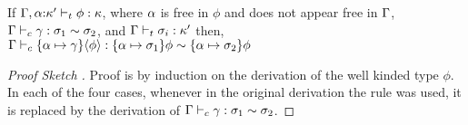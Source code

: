 \documentclass[screen,nonacm,manuscript,review]{acmart} %
\begin{document}
\begin{theorem}\label{lem:sfc-coercion-lifting}
 If $\Gamma,\alpha{:}\kappa' \vdash_{t} \phi : \kappa$, where $\alpha$ is free in $\phi$
 and does not appear free in $\Gamma$,
 $\Gamma \vdash_{c} \gamma : \sigma_1\sim\sigma_2$, and $\Gamma \vdash_{t} \sigma_i : \kappa'$
 then, $\Gamma \vdash_{c} \{\alpha\mapsto \gamma\}\langle{\phi}\rangle : \{\alpha\mapsto\sigma_1\}\phi\sim\{\alpha\mapsto\sigma_2\}\phi$
\end{theorem}
\begin{proof}[Proof Sketch ]
 Proof is by induction on the derivation of the well kinded type
 $\phi$. In each of the four cases, whenever in the original
 derivation the rule  was used, it is replaced by the
 derivation of $\Gamma \vdash_{c} \gamma : \sigma_1\sim\sigma_2$.
\end{proof}

\newcommand\TVar{
 \ib{\irule[\trule{var}]
 {x\co\tau \in \TEnv};
 {\Typing \TEnv x \tau}
 }
}

\newcommand\TAbs{
 \ib{\irule[\trule{\I\to}]
 {\Typing {\TEnv,x\co\sigma} {M} {\tau}};
 {\Typing \TEnv {\Lam x M} {\sigma \to \tau}}
 }
}
\newcommand\TApp{
 \ib{\irule[\trule{\E\to}]
 {\Typing \TEnv \Tm {\sigma \to \tau}}
 {\Typing \TEnv N \sigma};
 {\Typing \TEnv {\Tm \App N} {\tau}}
 }
}
\newcommand\TTyApp{
 \ib{\irule[\trule{\E\forall}]
 {\Typing  \TEnv \Tm {\Forall {\alpha\co\kappa} \tau}}
 {\Kinding \TEnv \sigma \kappa};
 {\Typing  \TEnv {M\App\sigma} {\tau}}
 }
}

\newcommand\TTyAbs{
 \ib{\irule[\trule{\I\forall}]
   {\Typing {\TEnv,\alpha\co\kappa} \Tm \tau}
   {\alpha\#\TEnv};
   {\Typing \TEnv {\Forall {\alpha\co\kappa} \Tm} {\tau}}
 }
}

\newcommand\TAlt{
 \ib{\irule[\trule{alt}]
 {H\co{\Forall{\many{\alpha\co\kappa}}{\Forall{\many{\beta\co\iota}}{\many\sigma \to T\many\alpha}}}\in{\TEnv}}
 {\Subst = \Set{\many{\alpha \mapsto \tau'}}}
 {\Typing {\TEnv, \many{\beta\co\Subst\iota}, \many{x\co\Subst\sigma}} {N} {\tau} };
 {\Typing \TEnv {H\App\many{\beta\co\Subst\kappa}\App\many{x\co\Subst\sigma} \to N} {T\many{\tau'} \to \tau}}
 }
}

\newcommand\TCast{
 \ib{\irule[\trule{cast}]
 {\Typing \TEnv {\Tm} {\tau}}
 {\CoKinding \TEnv \Co {\tau \sim \sigma}};
 {\Typing \TEnv {\Cast \Tm \Co} {\sigma}}
 }
}
\newcommand\TCase{
 \ib{\irule[\trule{case}]
 {\Typing \TEnv {\Tm} {\sigma}}
 {\many{\Typing \TEnv {P \to N} {\sigma \to \tau}}};
 {\Typing \TEnv {\Case \Tm {\many{P \to N}}} {\tau}}
 }
}
\end{document}
